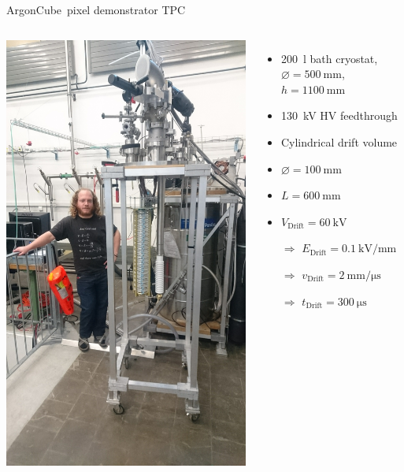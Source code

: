 \documentclass[]{beamer}
\newcommand*{\m}{\mathrm}
\newcommand*{\emphcol}{blue}
\newcommand*{\AC}{{ArgonCube}}
\begin{document}
\begin{frame}{\AC\ pixel demonstrator TPC}
	\begin{columns}[c]
		\centering
		\includegraphics[viewport=1200 200 2500 1800, clip, height=\textwidth, angle=-90]{defence/TPC}
		\begin{itemize}
			\item \SI{200}{\litre} bath cryostat, $\varnothing = \SI{500}{\milli\meter}$, $h = \SI{1100}{\milli\metre}$
			\item \SI{130}{\kilo\volt} HV feedthrough
			\item Cylindrical drift volume
			\item $\varnothing = \SI{100}{\milli\meter}$
			\item $L = \SI{600}{\milli\meter}$
			\item $V_{\m{Drift}} = \SI{60}{\kilo\volt}$
			\item[$\Rightarrow$] {\color{\emphcol} $E_{\m{Drift}} = \SI{0.1}{\kilo\volt\per\milli\meter}$}
			\item[$\Rightarrow$] $v_{\m{Drift}} = \SI{2}{\milli\meter\per\micro\second}$
			\item[$\Rightarrow$] {\color{\emphcol} $t_{\m{Drift}} = \SI{300}{\micro\second}$}
		\end{itemize}
	\end{columns}
\end{frame}
\end{document}
